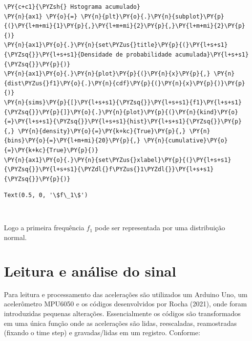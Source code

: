 \begin{tcolorbox}[breakable, size=fbox, boxrule=1pt, pad at break*=1mm,colback=cellbackground, colframe=cellborder]
\begin{Verbatim}[commandchars=\\\{\}]
\PY{c+c1}{\PYZsh{} Hstograma acumulado}
\PY{n}{ax1} \PY{o}{=} \PY{n}{plt}\PY{o}{.}\PY{n}{subplot}\PY{p}{(}\PY{l+m+mi}{1}\PY{p}{,}\PY{l+m+mi}{2}\PY{p}{,}\PY{l+m+mi}{2}\PY{p}{)}
\PY{n}{ax1}\PY{o}{.}\PY{n}{set\PYZus{}title}\PY{p}{(}\PY{l+s+s1}{\PYZsq{}}\PY{l+s+s1}{Densidade de probabilidade acumulada}\PY{l+s+s1}{\PYZsq{}}\PY{p}{)}
\PY{n}{ax1}\PY{o}{.}\PY{n}{plot}\PY{p}{(}\PY{n}{x}\PY{p}{,} \PY{n}{dist\PYZus{}f1}\PY{o}{.}\PY{n}{cdf}\PY{p}{(}\PY{n}{x}\PY{p}{)}\PY{p}{)}
\PY{n}{sims}\PY{p}{[}\PY{l+s+s1}{\PYZsq{}}\PY{l+s+s1}{f1}\PY{l+s+s1}{\PYZsq{}}\PY{p}{]}\PY{o}{.}\PY{n}{plot}\PY{p}{(}\PY{n}{kind}\PY{o}{=}\PY{l+s+s1}{\PYZsq{}}\PY{l+s+s1}{hist}\PY{l+s+s1}{\PYZsq{}}\PY{p}{,} \PY{n}{density}\PY{o}{=}\PY{k+kc}{True}\PY{p}{,} \PY{n}{bins}\PY{o}{=}\PY{l+m+mi}{20}\PY{p}{,} \PY{n}{cumulative}\PY{o}{=}\PY{k+kc}{True}\PY{p}{)}
\PY{n}{ax1}\PY{o}{.}\PY{n}{set\PYZus{}xlabel}\PY{p}{(}\PY{l+s+s1}{\PYZsq{}}\PY{l+s+s1}{\PYZdl{}f\PYZus{}1\PYZdl{}}\PY{l+s+s1}{\PYZsq{}}\PY{p}{)}
\end{Verbatim}
\end{tcolorbox}

            \begin{tcolorbox}[breakable, size=fbox, boxrule=.5pt, pad at break*=1mm, opacityfill=0]
\begin{Verbatim}[commandchars=\\\{\}]
Text(0.5, 0, '\$f\_1\$')
\end{Verbatim}
\end{tcolorbox}
        
    \begin{center}
    \end{center}
    { \hspace*{\fill} \\}
    
    Logo a primeira frequência \(f_1\) pode ser representada por uma
distribuição normal.

    \hypertarget{leitura-e-anuxe1lise-do-sinal}{%
\section{Leitura e análise do
sinal}\label{leitura-e-anuxe1lise-do-sinal}}

Para leitura e processamento das acelerações são utilizados um Arduino
Uno, um acelerômetro MPU6050 e os códigos desenvolvidos por Rocha
(2021), onde foram introduzidas pequenas alterações. Essencialmente os
códigos são transformados em uma única função onde as acelerações são
lidas, reescaladas, reamostradas (fixando o time step) e gravadas/lidas
em um registro. Conforme:

